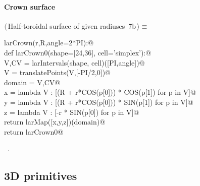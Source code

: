 \documentclass[11pt,oneside]{article}	%
\begin{document}
\paragraph{Crown surface}
\begin{flushleft} \small \label{scrap12}
\protect{}$\langle\,$Half-toroidal surface of given radiuses\nobreak\ {\footnotesize 7b}$\,\rangle\equiv$
\vspace{-1ex}
\begin{list}{}{} \item
\mbox{}\verb@def larCrown(r,R,angle=2*PI):@\\
\mbox{}\verb@   def larCrown0(shape=[24,36], cell='simplex'):@\\
\mbox{}\verb@      V,CV = larIntervals(shape, cell)([PI,angle])@\\
\mbox{}\verb@      V = translatePoints(V,[-PI/2,0])@\\
\mbox{}\verb@      domain = V,CV@\\
\mbox{}\verb@      x = lambda V : [(R + r*COS(p[0])) * COS(p[1]) for p in V]@\\
\mbox{}\verb@      y = lambda V : [(R + r*COS(p[0])) * SIN(p[1]) for p in V]@\\
\mbox{}\verb@      z = lambda V : [-r * SIN(p[0]) for p in V]@\\
\mbox{}\verb@      return larMap([x,y,z])(domain)@\\
\mbox{}\verb@   return larCrown0@\\
\mbox{}\verb@@{\NWsep}
\end{list}
\vspace{-1ex}
\footnotesize\addtolength{\baselineskip}{-1ex}
\begin{list}{}{\setlength{\itemsep}{-\parsep}\setlength{\itemindent}{-\leftmargin}}
\item \NWtxtMacroRefIn\ .
\end{list}
\end{flushleft}

\subsection{3D primitives}
\end{document}
